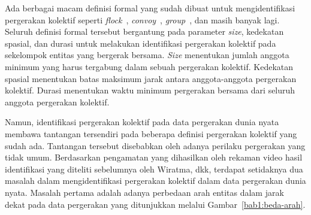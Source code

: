 

\iffalse 

\lionov{sebaiknya ada ilustrasi kayak Figure 1.7 di thesis, buat memperjelas apa itu pergerakan kolektif} \cristopher{sedang digambar}.
\fi

Ada berbagai macam definisi formal yang sudah dibuat untuk mengidentifikasi pergerakan kolektif seperti \textit{flock}~\cite{cao:flock, gudmundsson:flock}, \textit{convoy}~\cite{jeung:convoys}, \textit{group}~\cite{buchin:group, yida:group}, dan masih banyak lagi. Seluruh definisi formal tersebut bergantung pada parameter \textit{size}\iffalse \lionov{ini jadi aneh, pake {\it size} aja deh} kelompok \fi, kedekatan spasial, dan durasi untuk melakukan identifikasi pergerakan kolektif pada sekelompok entitas yang bergerak bersama. \textit{Size} menentukan jumlah anggota minimum yang harus tergabung dalam sebuah pergerakan kolektif. Kedekatan spasial menentukan batas maksimum jarak antara anggota-anggota pergerakan kolektif. Durasi menentukan waktu minimum pergerakan bersama dari seluruh anggota pergerakan kolektif.

Namun, identifikasi pergerakan kolektif pada data pergerakan dunia nyata membawa tantangan tersendiri pada beberapa definisi pergerakan kolektif yang sudah ada. Tantangan tersebut disebabkan oleh adanya perilaku pergerakan yang tidak umum. Berdasarkan pengamatan yang dihasilkan oleh rekaman video hasil identifikasi yang diteliti sebelumnya oleh Wiratma, dkk\footnotemark[8], terdapat setidaknya dua masalah dalam mengidentifikasi pergerakan kolektif dalam data pergerakan dunia nyata. Masalah pertama adalah adanya perbedaan arah entitas dalam jarak dekat pada data pergerakan yang ditunjukkan melalui Gambar~\ref{bab1:beda-arah}.


